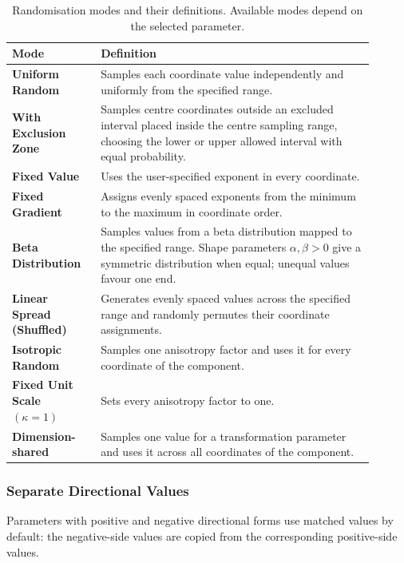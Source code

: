 \documentclass[journal,onecolumn]{IEEEtran}
\begin{document}
\begin{table}[H]
\centering
\small
\caption{Randomisation modes and their definitions. Available modes depend on the selected parameter.}
\label{tab:manual:parameter-generation-modes}
\begin{tabular}{@{}p{0.22\linewidth}>{\raggedright\arraybackslash}p{0.68\linewidth}@{}}
\toprule
\textbf{Mode} & \textbf{Definition} \\
\midrule
\textbf{Uniform Random} & Samples each coordinate value independently and uniformly from the specified range. \\
\textbf{With Exclusion Zone} & Samples centre coordinates outside an excluded interval placed inside the centre sampling range, choosing the lower or upper allowed interval with equal probability. \\
\textbf{Fixed Value} & Uses the user-specified exponent in every coordinate. \\
\textbf{Fixed Gradient} & Assigns evenly spaced exponents from the minimum to the maximum in coordinate order. \\
\textbf{Beta Distribution} & Samples values from a beta distribution mapped to the specified range. Shape parameters $\alpha,\beta>0$ give a symmetric distribution when equal; unequal values favour one end. \\
\textbf{Linear Spread (Shuffled)} & Generates evenly spaced values across the specified range and randomly permutes their coordinate assignments. \\
\textbf{Isotropic Random} & Samples one anisotropy factor and uses it for every coordinate of the component. \\
\textbf{Fixed Unit Scale \((\kappa=1)\)} & Sets every anisotropy factor to one. \\
\textbf{Dimension-shared} & Samples one value for a transformation parameter and uses it across all coordinates of the component. \\
\bottomrule
\end{tabular}
\end{table}

\subsubsection{Separate Directional Values}
\label{ssec:manual:generator-separate-directions}

Parameters with positive and negative directional forms use matched values by default: the negative-side values are copied from the corresponding positive-side values.
\end{document}
